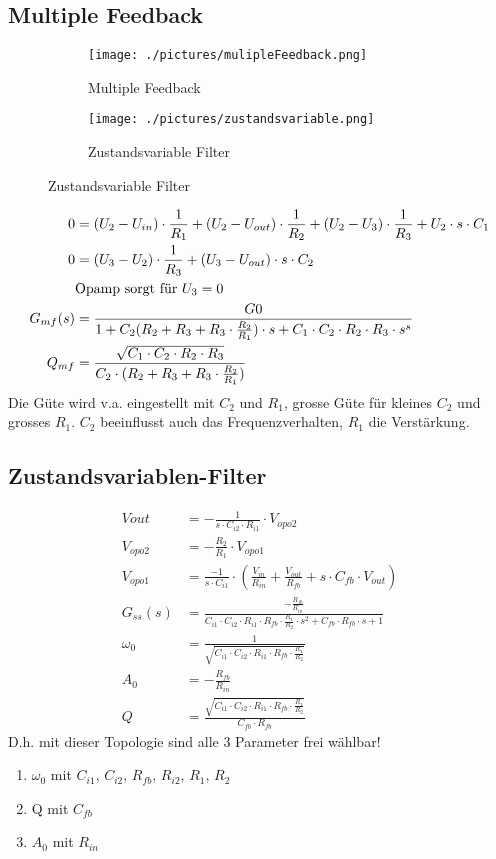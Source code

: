 \subsection{Multiple Feedback}
\begin{figure}[!h]
	\centering
	\begin{subfigure}[b]{0.45\textwidth}
		\texttt{[image: ./pictures/mulipleFeedback.png]}
		\caption{Multiple Feedback}
	\end{subfigure}
	\begin{subfigure}[b]{0.45\textwidth}
		\texttt{[image: ./pictures/zustandsvariable.png]}
		\caption{Zustandsvariable Filter}
	\end{subfigure}
\end{figure}
\begin{align*}
0			&=(U_2-U_{in})\cdot \frac{1}{R_1}+(U_2-U_{out})\cdot \frac{1}{R_2}+(U_2-U_3)\cdot \frac{1}{R_3}+U_2\cdot s\cdot C_1\\
0			&=(U_3-U_2)\cdot \frac{1}{R_3}+(U_3-U_{out})\cdot s\cdot C_2\\
			&\text{Opamp sorgt für }U_3=0\notag\\
G_{mf}(s)	&=\frac{G0}{1+C_2(R_2+R_3+R_3\cdot \frac{R_2}{R_1})\cdot s+C_1\cdot C_2\cdot R_2\cdot R_3\cdot s^s}\\
Q_{mf}		&=\frac{\sqrt{C_1\cdot C_2\cdot R_2\cdot R_3}}{C_2\cdot (R_2+R_3+R_3\cdot \frac{R_2}{R_1})}
\end{align*}
Die Güte wird v.a. eingestellt mit $C_2$ und $R_1$, grosse Güte für kleines
$C_2$ und grosses $R_1$. $C_2$ beeinflusst auch das Frequenzverhalten, $R_1$ die
Verstärkung.

\subsection{Zustandsvariablen-Filter}
\begin{align*}
	V{out}		&=-\frac{1}{s\cdot C_{i2}\cdot R_{i1}}\cdot V_{opo2}\\
	V_{opo2}	&=-\frac{R_2}{R_1}\cdot V_{opo1}\\
	V_{opo1}	&=\frac{-1}{s\cdot C_{i1}}\cdot (\frac{V_{in}}{R_{in}}+\frac{V_{out}}{R_{fb}}+s\cdot C_{fb}\cdot V_{out})\\
	G_{ss}(s)	&=\frac{-\frac{R_{fb}}{R_{in}}}{C_{i1}\cdot C_{i2}\cdot R_{i1}\cdot R_{fb}\cdot \frac{R_1}{R_2}\cdot s^2+C_{fb}\cdot R_{fb}\cdot s+1}\\
	\omega_{0}	&=\frac{1}{\sqrt{C_{i1}\cdot C_{i2}\cdot R_{i1}\cdot R_{fb}\cdot \frac{R_1}{R_2}}}\\
	A_{0}		&=-\frac{R_{fb}}{R_{in}}\\
	Q			&=\frac{\sqrt{C_{i1}\cdot C_{i2}\cdot R_{i1}\cdot R_{fb}\cdot \frac{R_1}{R_2}}}{C_{fb}\cdot R_{fb}}
\end{align*}
D.h. mit dieser Topologie sind alle 3 Parameter frei wählbar!
\begin{enumerate}
  \item $\omega_{0}$ mit $C_{i1}$, $C_{i2}$, $R_{fb}$, $R_{i2}$, $R_1$, $R_2$
  \item Q mit $C_{fb}$
  \item $A_0$ mit $R_{in}$
\end{enumerate}


